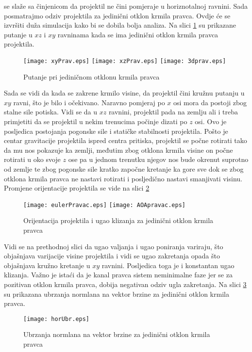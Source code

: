 se slaže sa činjenicom da projektil ne čini pomjeraje u horiznotalnoj ravnini. 
Sada posmatrajmo odziv projektila za jedinični otklon krmila pravca. Ovdje će se izvršiti 
duža simulacija kako bi se dobila bolja analiza. Na slici \ref{fig:putanjePrav} su prikazane 
putanje u $xz$ i $xy$ ravninama kada se ima jedinični otklon krmila pravca projektila. 
\begin{figure}[!ht]
    \centering
    \texttt{[image: xyPrav.eps]}
    \texttt{[image: xzPrav.eps]}
    \texttt{[image: 3dprav.eps]}
    \caption{Putanje pri jediničnom otklonu krmila pravca}
    \label{fig:putanjePrav}
\end{figure}
Sada se vidi da kada se zakrene krmilo visine, da projektil čini kružnu putanju u $xy$ ravni, što je bilo 
i očekivano. Naravno pomjeraj po $x$ osi mora da postoji zbog stalne sile potiska. Vidi se da u 
$xz$ ravnini, projektil pada na zemlju ali i treba primjetiti da se projektil u nekim 
trenucima počinje dizati po $z$ osi. Ovo je posljedica postojanja pogonske sile i statičke stabilnosti projektila. 
Pošto je centar gravitacije projektila ispred centra pritiska, projektil se počne rotirati tako da mu nos 
pokazuje ka zemlji, međutim zbog otklona krmila visine on počne rotirati u oko svoje $z$ ose pa u jednom trenutku 
njegov nos bude okrenut suprotno od zemlje te zbog pogonske sile kratko započne kretanje ka gore sve dok se 
zbog otklona krmila pravca ne nastavi rotirati i posljedično nastavi smanjivati visinu. 
Promjene orijentacije projektila se vide na slici \ref{fig:eulerPravac}
\begin{figure}[!ht]
    \centering
    \texttt{[image: eulerPravac.eps]}
    \texttt{[image: AOApravac.eps]}
    \caption{Orijentacija projektila i ugao klizanja za jedinični otklon krmila pravca}
    \label{fig:eulerPravac}
\end{figure}
Vidi se na prethodnoj slici da ugao valjanja i ugao poniranja variraju, što objašnjava 
varijacije visine projektila i vidi se ugao zakretanja opada što objašnjava kružno kretanje 
u $xy$ ravnini. Posljedica toga je i konstantan ugao klizanja. Važno je istaći da je kanal pravca 
sistem neminimalne faze jer se za pozitivan otklon krmila pravca, dobija negativan odziv ugla zakretanja. 
Na slici \ref{fig:horaccprav} su prikazana ubrzanja normlana na vektor brzine 
za jedinični otklon krmila pravca. 
\begin{figure}[!ht]
    \centering
    \texttt{[image: horUbr.eps]}
    \caption{Ubrzanja normlana na vektor brzine za jedinični otklon krmila pravca}
    \label{fig:horaccprav}
\end{figure}
